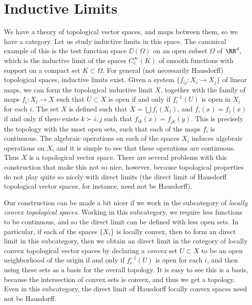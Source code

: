 \section{Inductive Limits}

We have a theory of topological vector spaces, and maps between them, so we have a category. Let us study inductive limits in this space. The canonical example of this is the test function space $\DD(\Omega)$ on an open subset $\Omega$ of $\RR^d$, which is the inductive limit of the spaces $C_c^\infty(K)$ of smooth functions with support on a compact set $K \subset \Omega$. For general (not necessarily Hausdorff) topological spaces, inductive limits exist. Given a system $\{ f_{ij}: X_i \to X_j \}$ of linear maps, we can form the topological inductive limit $X$, together with the family of maps $f_i: X_i \to X$ such that $U \subset X$ is open if and only if $f_i^{-1}(U)$ is open in $X_i$ for each $i$. The set $X$ is defined such that $X = \bigcup f_i(X_i)$, and $f_i(x) = f_j(x)$ if and only if there exists $k \succ i,j$ such that $f_{ik}(x) = f_{jk}(y)$. This is precisely the topology with the most open sets, such that each of the maps $f_i$ is continuous. The algebraic operations on each of the spaces $X_i$ induces algebraic operations on $X$, and it is simple to see that these operations are continuous. Thus $X$ is a topological vector space. There are several problems with this construction that make this not so nice, however, because topological properties do not play quite so nicely with direct limits (the direct limit of Hausdorff topological vector spaces, for instance, need not be Hausdorff).

Our construction can be made a bit nicer if we work in the subcategory of \emph{locally convex topological spaces}. Working in this subcategory, we require less functions to be continuous, and so the direct limit can be defined with less open sets. In particular, if each of the spaces $\{ X_i \}$ is locally convex, then to form an direct limit in this subcategory, then we obtain an direct limit in the category of locally convex topological vector spaces by declaring a \emph{convex} set $U \subset X$ to be an open neighborhood of the origin if and only if $f_i^{-1}(U)$ is open for each $i$, and then using these sets as a basis for the overall topology. It is easy to see this is a basis, because the intersection of convex sets is convex, and thus we get a topology. Even in this subcategory, the direct limit of Hausdorff locally convex spaces need not be Hausdorff.

